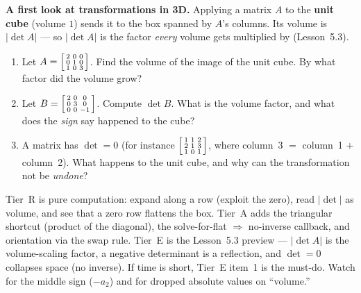 \documentclass[10pt]{article}
\begin{document}
\begin{tcolorbox}[colback=white, colframe=black!40, title=\textbf{Tier E --- Extension},
    fonttitle=\bfseries, arc=1.5mm, left=3mm, right=3mm, top=2mm, bottom=2mm, breakable]
\textbf{A first look at transformations in 3D.} Applying a matrix $A$ to the \textbf{unit cube}
(volume $1$) sends it to the box spanned by $A$'s columns. Its volume is $|\det A|$ --- so $|\det A|$
is the factor \emph{every} volume gets multiplied by (Lesson~5.3).
\begin{enumerate}[leftmargin=1.7em, itemsep=9pt]
  \item Let $A=\begin{bsmallmatrix} 2 & 0 & 0 \\ 0 & 1 & 0 \\ 1 & 0 & 3 \end{bsmallmatrix}$. Find the volume of the image
        of the unit cube. By what factor did the volume grow?
  \item Let $B=\begin{bsmallmatrix} 2 & 0 & 0 \\ 0 & 3 & 0 \\ 0 & 0 & -1 \end{bsmallmatrix}$. Compute $\det B$.
        What is the volume factor, and what does the \emph{sign} say happened to the cube?
  \item A matrix has $\det=0$ (for instance $\begin{bsmallmatrix} 1 & 1 & 2 \\ 2 & 1 & 3 \\ 1 & 0 & 1 \end{bsmallmatrix}$,
        where column~3 $=$ column~1 $+$ column~2). What happens to the unit cube, and why can the
        transformation not be \emph{undone}?
\end{enumerate}
\end{tcolorbox}

\begin{teachernote}
Tier~R is pure computation: expand along a row (exploit the zero), read $|\det|$ as volume, and see
that a zero row flattens the box. Tier~A adds the triangular shortcut (product of the diagonal), the
solve-for-flat $\Rightarrow$ no-inverse callback, and orientation via the swap rule. Tier~E is the
Lesson~5.3 preview --- $|\det A|$ is the volume-scaling factor, a negative determinant is a reflection,
and $\det=0$ collapses space (no inverse). If time is short, Tier~E item~1 is the must-do. Watch for the
middle sign ($-a_2$) and for dropped absolute values on ``volume.''
\end{teachernote}
\end{document}
